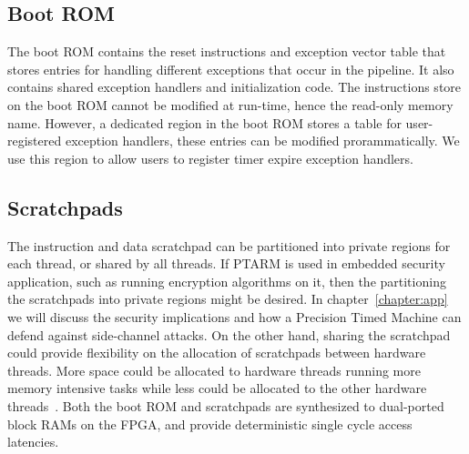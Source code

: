 \subsection{Boot ROM}
The boot ROM  contains the reset instructions and exception vector table that stores entries for handling different exceptions that occur in the pipeline.
It also contains shared exception handlers and initialization code. 
The instructions store on the boot ROM cannot be modified at run-time, hence the read-only memory name. 
However, a dedicated region in the boot ROM stores a table for user-registered exception handlers, these entries can be modified prorammatically. 
We use this region to allow users to register timer expire exception handlers.
  
\subsection{Scratchpads}  
The instruction and data scratchpad  can be partitioned into private regions for each thread, or shared by all threads.
If PTARM is used in embedded security application, such as running encryption algorithms on it, then the partitioning the scratchpads into private regions might be desired. 
In chapter~\ref{chapter:app} we will discuss the security implications and how a Precision Timed Machine can defend against side-channel attacks.
On the other hand, sharing the scratchpad could provide flexibility on the allocation of scratchpads between hardware threads.
More space could be allocated to hardware threads running more memory intensive tasks while less could be allocated to the other hardware threads~.
Both the boot ROM and scratchpads are synthesized to dual-ported block RAMs on the FPGA, and provide deterministic single cycle access latencies.

